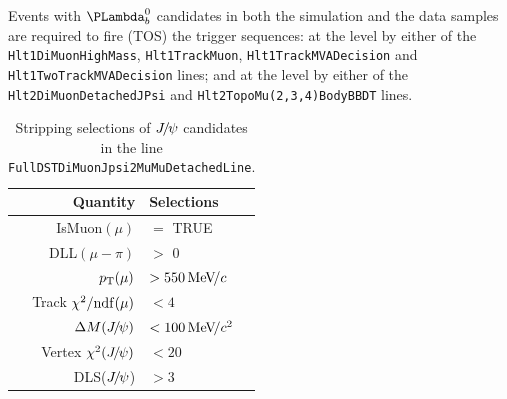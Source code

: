 Events with $\Lb$ candidates in both the simulation and the data samples are required to fire (TOS) the trigger sequences: 
at the \hltone level by either of the \texttt{Hlt1DiMuonHighMass}, \texttt{Hlt1TrackMuon}, \texttt{Hlt1TrackMVADecision} 
and \texttt{Hlt1TwoTrackMVADecision} lines; 
and at the \hlttwo level by either of
the \texttt{Hlt2DiMuonDetachedJPsi} and \texttt{Hlt2TopoMu(2,3,4)BodyBBDT} lines.



\begin{table}[tbh]
\caption{Stripping selections of ${{J\mskip -3mu/\mskip -2mu\psi}}$ candidates in the line \texttt{FullDSTDiMuonJpsi2MuMuDetachedLine}.}
\centering
\begin{tabular}{rl}
\hline
Quantity               & Selections \\
\hline
IsMuon$(\mu)$          & $=$ TRUE \\
DLL$(\mu-\pi)$     & $>$ 0\\
$p_{\mathrm{T}}(\mu)$             & $>550\text{\,Me\kern -0.1em V\!/}c$ \\
Track $\chi^2/\mathrm{ndf}(\mu)$ & $<4$  \\
$\Delta M({{J\mskip -3mu/\mskip -2mu\psi}})$      & $<100\text{\,Me\kern -0.1em V\!/}c^2$\\
Vertex $\chi^2({{J\mskip -3mu/\mskip -2mu\psi}})$ & $<20$ \\
DLS(${{J\mskip -3mu/\mskip -2mu\psi}}$)           & $>3$  \\
\hline
\end{tabular}
\label{tab:JpsiSelection}
\end{table}

